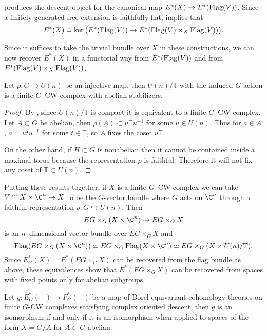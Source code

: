 produces the descent object for the canonical map $E^*(X) \rightarrow E^*(\operatorname{Flag}(V))$. Since a finitely-generated free extension is faithfully flat,  implies that
\begin{equation*}
E^*(X) \cong \ker \big (E^*(\operatorname{Flag}(V)) \rightarrow E^*(\operatorname{Flag}(V) \times_X \operatorname{Flag}(V)) \big ).
\end{equation*}

Since it suffices to take the trivial bundle over $X$ in these constructions, we can now recover $E^*(X)$ in a functorial way from $E^*(\operatorname{Flag}(V))$ and from $E^*(\operatorname{Flag}(V) \times_X \operatorname{Flag}(V))$.

\begin{proposition}
Let $\rho \colon G \rightarrow U(n)$ be an injective map, then $U(n)/\mathbb{T}$ with the induced $G$-action is a finite $G$--CW complex with abelian stabilizers.
\end{proposition}
\begin{proof}
By , since $U(n)/\mathbb{T}$ is compact it is equivalent to a finite $G$--CW complex. Let $A \subset G$ be abelian, then $\rho(A) \subset u\mathbb{T}u^{-1}$ for some $u \in U(n)$. Thus for $a \in A$, $a = utu^{-1}$ for some $t \in \mathbb{T}$, so $A$ fixes the coset $u\mathbb{T}$.

On the other hand, if $H \subset G$ is nonabelian then it cannot be contained inside a maximal
torus because the representation $\rho$ is faithful. Therefore it will not fix any coset of $\mathbb{T} \subset U(n)$.
\end{proof}

Putting these results together, if $X$ is a finite $G$--CW complex we can take $V \cong X \times \C^n \rightarrow X$ to be the $G$-vector bundle where $G$ acts on $\C^n$ through a faithful representation $\rho \colon G \hookrightarrow U(n)$. Then 
\[
EG \times_G (X \times \C^n) \rightarrow EG \times_G X
\]
is an $n$--dimensional vector bundle over $EG \times_G X$ and
\[
\Flag(EG \times_G (X \times \C^n)) \simeq EG \times_G \Flag(X \times \C^n) \simeq EG \times_G (X \times U(n)/\mathbb{T}).
\]
Since $E^{*}_{G}(X) = E^*(EG \times_G X)$ can be recovered from the flag bundle as above, these equivalences show that $E^*(EG \times_G X)$ can be recovered from spaces with fixed points only for abelian subgroups. 

\begin{proposition} \label{app:codescent}
Let $g \colon E_{G}^*(-) \rightarrow F_{G}^*(-)$ be a map of Borel equivariant cohomology theories on finite $G$-CW complexes satisfying complex oriented descent, then $g$ is an isomorphism if and only if it is an isomorphism when applied to spaces of the form $X = G/A$ for $A \subset G$ abelian.
\end{proposition}

